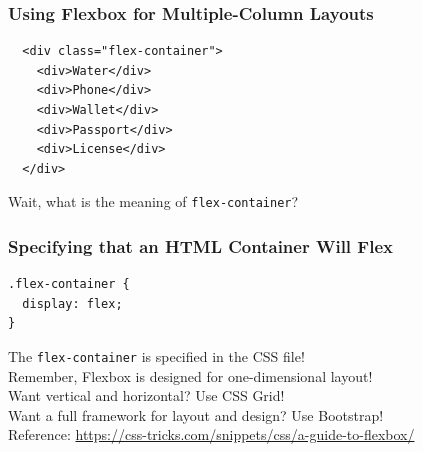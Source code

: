 \documentclass[14pt,aspectratio=169]{beamer}
\begin{document}
%
\begin{frame}[fragile]
  \frametitle{Using Flexbox for Multiple-Column Layouts}
  \normalsize
  \begin{minipage}{6in}
    \vspace*{.2in}
    \begin{verbatim}
  <div class="flex-container">
    <div>Water</div>
    <div>Phone</div>
    <div>Wallet</div>
    <div>Passport</div>
    <div>License</div>
  </div>
    \end{verbatim}
  \end{minipage}
  \vspace*{.05in}
  \begin{center}
    \noindent Wait, what is the meaning of {\tt flex-container}? \\
  \end{center}
\end{frame}

%
\begin{frame}[fragile]
  \frametitle{Specifying that an HTML Container Will Flex}
  \normalsize
  \begin{minipage}{6in}
    \vspace*{.2in}
    \begin{verbatim}
.flex-container {
  display: flex;
}
    \end{verbatim}
  \end{minipage}
  \vspace*{.05in}
  \begin{center}
    \noindent The {\tt flex-container} is specified in the CSS file! \\
    \noindent Remember, Flexbox is designed for one-dimensional layout! \\
    \noindent Want vertical and horizontal? Use CSS Grid! \\
    \noindent Want a full framework for layout and design? Use Bootstrap! \\
    \noindent Reference: \url{https://css-tricks.com/snippets/css/a-guide-to-flexbox/} \\
  \end{center}
\end{frame}
\end{document}
